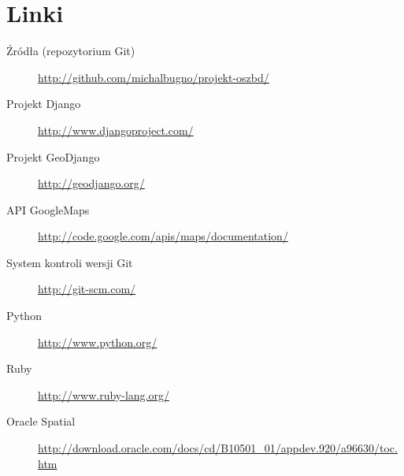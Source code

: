\documentclass[12pt]{article}
\begin{document}
\section{Linki}
\begin{description}
  \item[Źródła (repozytorium Git)] \url{http://github.com/michalbugno/projekt-oszbd/}
  \item[Projekt Django] \url{http://www.djangoproject.com/}
  \item[Projekt GeoDjango] \url{http://geodjango.org/}
  \item[API GoogleMaps] \url{http://code.google.com/apis/maps/documentation/}
  \item[System kontroli wersji Git] \url{http://git-scm.com/}
  \item[Python] \url{http://www.python.org/}
  \item[Ruby] \url{http://www.ruby-lang.org/}
  \item[Oracle Spatial] \url{http://download.oracle.com/docs/cd/B10501\_01/appdev.920/a96630/toc.htm}
\end{description}
\end{document}
